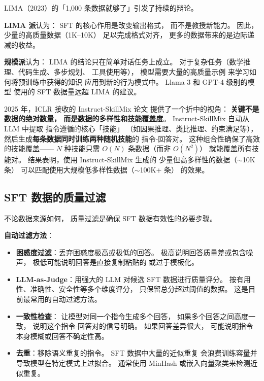 LIMA（2023）的「1,000 条数据就够了」引发了持续的辩论。

\textbf{LIMA 派}认为：
SFT 的核心作用是改变输出格式，
而不是教授新能力。
因此，少量的高质量数据（1K--10K）
足以完成格式对齐，
更多的数据带来的是边际递减的收益。

\textbf{规模派}认为：
LIMA 的结论只在简单对话任务上成立。
对于复杂任务（数学推理、代码生成、多步规划、
工具使用等），
模型需要大量的高质量示例
来学习如何将预训练中获得的知识
应用到新的行为模式中。
Llama 3 和 GPT-4 级别的模型
使用的 SFT 数据量远超 LIMA 的建议。


2025 年，ICLR 接收的 Instruct-SkillMix 论文
提供了一个折中的视角：
\textbf{关键不是数据的绝对数量，
而是数据的多样性和技能覆盖度}。
Instruct-SkillMix 自动从 LLM 中提取
指令遵循的核心「技能」
（如因果推理、类比推理、约束满足等），
然后生成\textbf{每条数据同时训练两种随机技能}的
指令-回答对。
这种组合性确保了高效的技能覆盖——
$N$ 种技能只需 $O(N)$ 条数据（而非 $O(N^2)$）
就能覆盖所有技能对。
结果表明，使用 Instruct-SkillMix 生成的
少量但高多样性的数据（$\sim$10K 条）
可以匹配使用大规模低多样性数据（$\sim$100K+ 条）
的效果。

\subsection{SFT 数据的质量过滤}

不论数据来源如何，
质量过滤是确保 SFT 数据有效性的必要步骤。

\textbf{自动过滤方法}：
\begin{itemize}[noitemsep]
  \item \textbf{困惑度过滤}：丢弃困惑度极高或极低的回答。
        极高说明回答质量差或包含噪声，
        极低可能说明回答是直接复制粘贴的
        或过于模板化。
  \item \textbf{LLM-as-Judge}：用强大的 LLM
        对候选 SFT 数据进行质量评分。
        按有用性、准确性、安全性等多个维度评分，
        只保留总分超过阈值的数据。
        这是目前最常用的自动过滤方法。
  \item \textbf{一致性检查}：
        让模型对同一个指令生成多个回答，
        如果多个回答之间高度一致，
        说明这个指令-回答对的信号明确。
        如果回答差异很大，
        可能说明指令本身模糊或回答不确定性高。
  \item \textbf{去重}：移除语义重复的指令。
        SFT 数据中大量的近似重复
        会浪费训练容量并导致模型在特定模式上过拟合。
        通常使用 MinHash 或嵌入向量聚类来检测近似重复。
\end{itemize}

